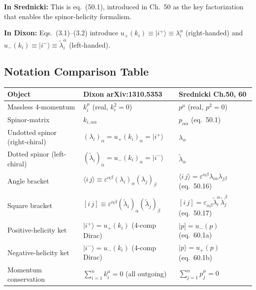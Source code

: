 \textbf{In Srednicki:} This is eq.~(50.1), introduced in Ch.~50 as the key factorization
that enables the spinor-helicity formalism.

\textbf{In Dixon:} Eqs.~(3.1)--(3.2) introduce $u_+(k_i)\equiv|i^+\rangle\equiv\lambda_i^\alpha$
(right-handed) and $u_-(k_i)\equiv|i^-\rangle\equiv\tilde\lambda_i^{\dot\alpha}$ (left-handed).

\subsection{Notation Comparison Table}
\label{sec:notation-table}

\begin{center}
\renewcommand{\arraystretch}{1.6}
\begin{tabular}{@{}p{}p{}p{}@{}}
  \toprule
  \textbf{Object} & \textbf{Dixon arXiv:1310.5353} & \textbf{Srednicki Ch.50, 60} \\
  \midrule
  Massless 4-momentum & $k_i^\mu$ (real, $k_i^2=0$) & $p^\mu$ (real, $p^2=0$) \\[4pt]
  Spinor-matrix & $k_{i,\alpha\dot\alpha}$ & $p_{\alpha\dot\alpha}$ (eq.~50.1) \\[4pt]
  Undotted spinor (right-chiral) & $(\lambda_i)_\alpha = u_+(k_i)_\alpha = |i^+\rangle$ & $\lambda_\alpha$ \\[4pt]
  Dotted spinor (left-chiral) & $(\tilde\lambda_i)_{\dot\alpha} = u_-(k_i)_{\dot\alpha} = |i^-\rangle$ & $\tilde\lambda_{\dot\alpha}$ \\[4pt]
  Angle bracket & $\langle i\,j\rangle\equiv\varepsilon^{\alpha\beta}(\lambda_i)_\alpha(\lambda_j)_\beta$ & $\langle i\,j\rangle = \varepsilon^{\alpha\beta}\lambda_{i\alpha}\lambda_{j\beta}$ (eq.~50.16) \\[4pt]
  Square bracket & $[i\,j]\equiv\varepsilon^{\dot\alpha\dot\beta}(\tilde\lambda_i)_{\dot\alpha}(\tilde\lambda_j)_{\dot\beta}$ & $[i\,j]=\varepsilon_{\dot\alpha\dot\beta}\tilde\lambda_i^{\dot\alpha}\tilde\lambda_j^{\dot\beta}$ (eq.~50.17) \\[4pt]
  Positive-helicity ket & $|i^+\rangle=u_+(k_i)$ (4-comp Dirac) & $|p]=u_-(p)$ (eq.~60.1a) \\[4pt]
  Negative-helicity ket & $|i^-\rangle=u_-(k_i)$ (4-comp Dirac) & $|p\rangle=u_+(p)$ (eq.~60.1b) \\[4pt]
  Momentum conservation & $\sum_{i=1}^n k_i^\mu=0$ (all outgoing) & $\sum_{j=1}^n p_j^\mu=0$ \\[4pt]
  \bottomrule
\end{tabular}
\end{center}

